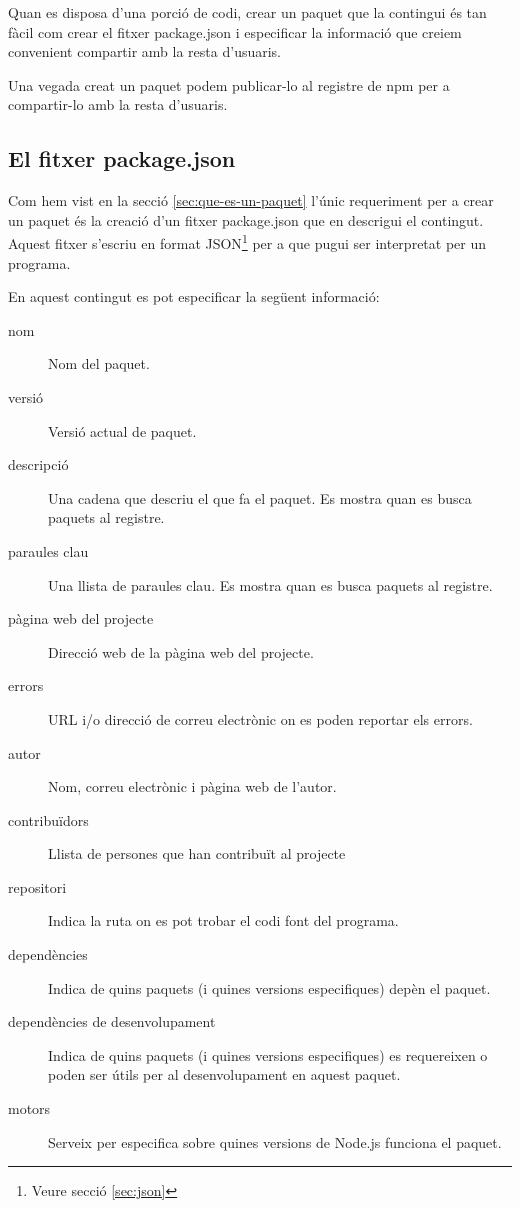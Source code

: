 Quan es disposa d'una porció de codi, crear un paquet que la contingui és tan fàcil com crear el fitxer package.json i especificar la informació que creiem convenient compartir amb la resta d'usuaris. 

Una vegada creat un paquet podem publicar-lo al registre de npm per a compartir-lo amb la resta d'usuaris. 

\subsection{El fitxer package.json}
\label{sec:fitxer-package.json}

Com hem vist en la secció \ref{sec:que-es-un-paquet} l'únic requeriment per a crear un paquet és la creació d'un fitxer package.json que en descrigui el contingut. Aquest fitxer s'escriu en format JSON\footnote{Veure secció \ref{sec:json}} per a que pugui ser interpretat per un programa.

En aquest contingut es pot especificar la següent informació: 
\begin{description}
\item[nom] {Nom del paquet.}
\item[versió] {Versió actual de paquet.}
\item[descripció] {Una cadena que descriu el que fa el paquet. Es mostra quan es busca paquets al registre.}
\item[paraules clau] {Una llista de paraules clau. Es mostra quan es busca paquets al registre.}
\item[pàgina web del projecte] {Direcció web de la pàgina web del projecte.}
\item[errors] { URL i/o direcció de correu electrònic on es poden reportar els errors. }
\item[autor] {Nom, correu electrònic i pàgina web de l'autor.}
\item[contribuïdors] { Llista de persones que han contribuït al projecte}
\item[repositori] { Indica la ruta on es pot trobar el codi font del programa. }
\item[dependències] { Indica de quins paquets (i quines versions especifiques) depèn el paquet.}
\item[dependències de desenvolupament] { Indica de quins paquets (i quines versions especifiques) es requereixen o poden ser útils per al desenvolupament en aquest paquet.}
\item[motors] {Serveix per especifica sobre quines versions de Node.js funciona el paquet.}
\end{description}

